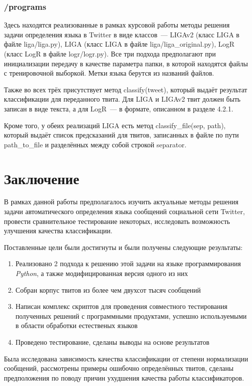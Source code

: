 \documentclass[a4paper, 14pt]{article}
\begin{document}
			\subsubsection{/programs}
				Здесь находятся реализованные в рамках курсовой работы методы решения задачи определения языка в Twitter в виде классов~--- LIGAv2 (класс LIGA в файле liga/liga.py), LIGA (класс LIGA в файле liga/liga_original.py), LogR (класс LogR в файле logr/logr.py). Все три подхода
				предполагают при инициализации передачу в качестве параметра папки, в которой находятся файлы с тренировочной выборкой. Метки языка
				берутся из названий файлов.
				
				Также во всех трёх присутствует метод classify(tweet), который выдаёт результат классификации для переданного твита. Для LIGA и LIGAv2 твит должен быть записан в виде текста, а для LogR~--- в формате, описанном в разделе 4.2.1.
				
				Кроме того, у обеих реализаций LIGA есть метод classify_file(sep, path), который выдаёт список предсказаний для твитов,
				записанных в файле по пути path_to_file и разделённых между собой строкой separator.

\pagebreak
	
\section{Заключение}
		В рамках данной работы предполагалось изучить актуальные методы решения задачи автоматического определения языка сообщений социальной сети Twitter, провести сравнительное тестирование некоторых, исследовать возможность улучшения качества классификации. 
		
		Поставленные цели были достигнуты и были получены следующие результаты:
		\begin{enumerate}
			\item Реализовано 2 подхода к решению этой задачи на языке программирования \textit{Python}, а также модифицированная версия одного из них
			\item Собран корпус твитов из более чем двухсот тысяч сообщений
			\item Написан комплекс скриптов для проведения совместного тестирования полученных решений с программными продуктами, успешно используемыми в области обработки естественых языков
			\item Проведено тестирование, сделаны выводы на основе результатов
		\end{enumerate}
		Была исследована зависимость качества классификации от степени нормализации сообщений, 
		рассмотрены примеры ошибочно определённых твитов, сделаны предположения по поводу причин ухудшения качества работы классификаторов.
		
\end{document}
